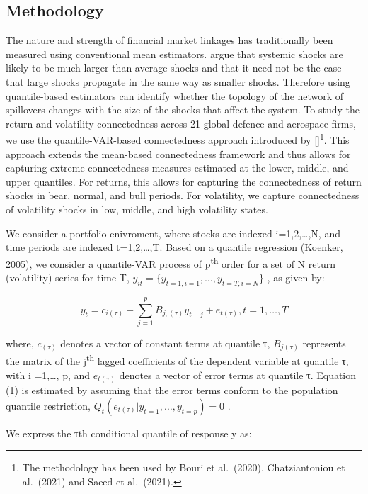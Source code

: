 \documentclass[
  number]{elsarticle}
\begin{document}
\hypertarget{methodology}{%
\subsection{Methodology}\label{methodology}}

The nature and strength of financial market linkages has traditionally
been measured using conventional mean estimators. \citep{Ando.2022}
argue that systemic shocks are likely to be much larger than average
shocks and that it need not be the case that large shocks propagate in
the same way as smaller shocks. Therefore using quantile-based
estimators can identify whether the topology of the network of
spillovers changes with the size of the shocks that affect the system.
To study the return and volatility connectedness across 21 global
defence and aerospace firms, we use the quantile-VAR-based connectedness
approach introduced by {[}\citep{Ando.2022}{]}\footnote{The methodology
  has been used by Bouri et al.~(2020), Chatziantoniou et al.~(2021) and
  Saeed et al.~(2021).}. This approach extends the mean-based
connectedness framework \citep{Diebold.2009, Diebold.2014} and thus
allows for capturing extreme connectedness measures estimated at the
lower, middle, and upper quantiles. For returns, this allows for
capturing the connectedness of return shocks in bear, normal, and bull
periods. For volatility, we capture connectedness of volatility shocks
in low, middle, and high volatility states.

We consider a portfolio enivroment, where stocks are indexed
i=1,2,\ldots,N, and time periods are indexed t=1,2,\ldots,T. Based on a
quantile regression (Koenker, 2005), we consider a quantile-VAR process
of p\textsuperscript{th} order for a set of N return (volatility) series
for time T, \(y_{it}=\{y_{t=1,i=1},\dots,y_{t=T,i=N}\}\) , as given by:

\[
y_{t}=c_{i(\tau)}+\sum_{j=1}^{p} B_{j,(\tau)} y_{t-j}+e_{t(\tau)}, t=1,\dots,T
\]

where, \(c_{(\tau)}\) denotes a vector of constant terms at quantile τ,
\(B_{j(\tau)}\) represents the matrix of the j\textsuperscript{th}
lagged coefficients of the dependent variable at quantile τ, with i
=1,\ldots, p, and \(e_{t(\tau)}\) denotes a vector of error terms at
quantile τ. Equation (1) is estimated by assuming that the error terms
conform to the population quantile restriction,
\(Q_t(e_{t(\tau)} |y_{t=1},\dots,y_{t=p})=0\) .

We express the τth conditional quantile of response y as:
\end{document}
